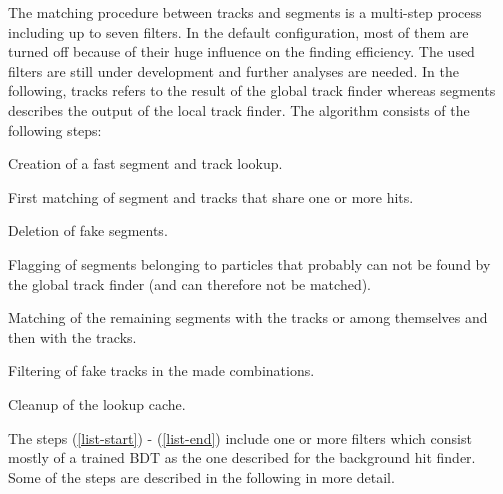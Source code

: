 The matching procedure between tracks and segments is a multi-step process including up to seven filters. In the default configuration, most of them are turned off because of their huge influence on the finding efficiency. The used filters are still under development and further analyses are needed. In the following, tracks refers to the result of the global track finder whereas segments describes the output of the local track finder. The algorithm consists of the following steps:
\begin{zlist}
 \item Creation of a fast segment and track lookup.
 \item First matching of segment and tracks that share one or more hits. \label{list-start}
 \item Deletion of fake segments. \label{list-fakes}
 \item Flagging of segments belonging to particles that probably can not be found by the global track finder (and can therefore not be matched).
 \item Matching of the remaining segments with the tracks or among themselves and then with the tracks. \label{list-second}
 \item Filtering of fake tracks in the made combinations.  \label{list-end}
 \item Cleanup of the lookup cache.
\end{zlist}

The steps (\ref{list-start}) - (\ref{list-end}) include one or more filters which consist mostly of a trained BDT as the one described for the background hit finder. Some of the steps are described in the following in more detail.

